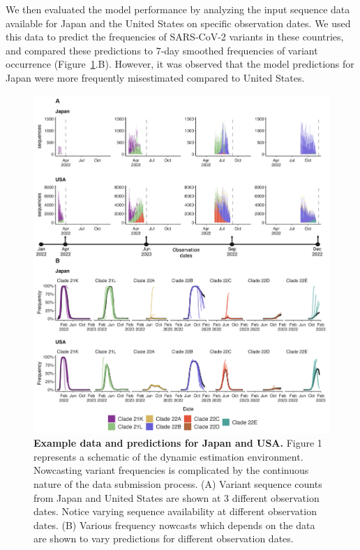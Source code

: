 \documentclass[11pt,oneside,letterpaper]{article}
\begin{document}
We then evaluated the model performance by analyzing the input sequence data available for Japan and the United States on specific observation dates.
We used this data to predict the frequencies of SARS-CoV-2 variants in these countries, and compared these predictions to 7-day smoothed frequencies of variant occurrence (Figure~\ref{fig:dynamic_forecast_env}.B).
However, it was observed that the model predictions for Japan were more frequently misestimated compared to United States.



\begin{figure}[H]
	\centering
	\includegraphics[width=0.8\textwidth=0.01]{figures/Dynamic_est_env.png}
	\caption{\textbf{Example data and predictions for Japan and USA.}
	Figure 1 represents a schematic of the dynamic estimation environment.
	Nowcasting variant frequencies is complicated by the continuous nature of the data submission process.
	(A) Variant sequence counts from Japan and United States are shown at 3 different observation dates.
	Notice varying sequence availability at different observation dates. 
	(B) Various frequency nowcasts which depends on the data are shown to vary predictions for different observation dates. 
	}
	\label{fig:dynamic_forecast_env}
\end{figure}
\end{document}
